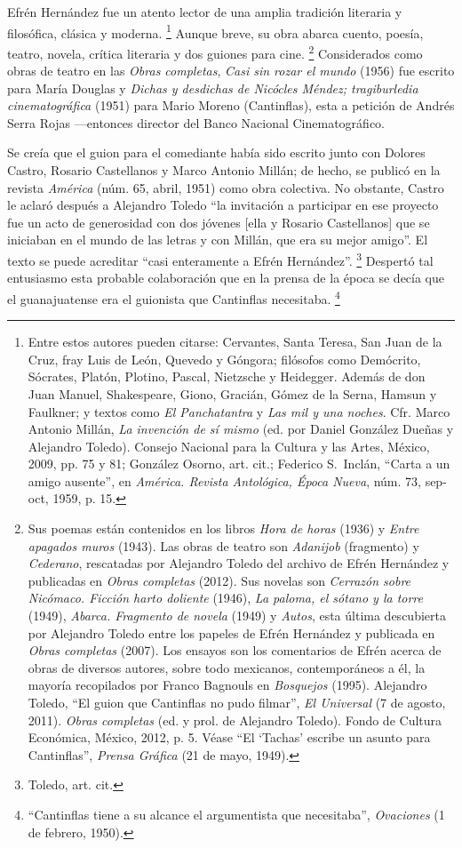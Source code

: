 \documentclass[14pt,twoside,final]{extbook} %
\let\oldfootnote\footnote
\renewcommand\footnote[1]{%
\oldfootnote{\hspace{1mm}#1}}
\begin{document}
Efrén Hernández fue un atento lector de una amplia tradición literaria y filosófica, clásica y moderna.\footnote{Entre estos autores pueden citarse: Cervantes, Santa Teresa, San Juan de la Cruz, fray Luis de León, Quevedo y Góngora; filósofos como Demócrito, Sócrates, Platón, Plotino, Pascal, Nietzsche y Heidegger. Además de don Juan Manuel, Shakespeare, Giono, Gracián, Gómez de la Serna, Hamsun y Faulkner; y textos como \emph{El Panchatantra} y \emph{Las mil y una noches}. Cfr. Marco Antonio Millán, \emph{La invención de sí mismo} (ed. por Daniel González Dueñas y Alejandro Toledo). Consejo Nacional para la Cultura y las Artes, México, 2009, pp. 75 y 81; González Osorno, art. cit.; Federico S.~Inclán, ``Carta a un amigo ausente'', en \emph{América. Revista Antológica, Época Nueva}, núm. 73, sep-oct, 1959, p. 15.} Aunque breve, su obra abarca cuento, poesía, teatro, novela, crítica literaria y dos guiones para cine.\footnote{Sus poemas están contenidos en los libros \emph{Hora de horas} (1936) y \emph{Entre apagados muros} (1943). Las obras de teatro son \emph{Adanijob} (fragmento) y \emph{Cederano}, rescatadas por Alejandro Toledo del archivo de Efrén Hernández y publicadas en \emph{Obras completas} (2012). Sus novelas son \emph{Cerrazón sobre Nicómaco. Ficción harto doliente} (1946), \emph{La paloma, el sótano y la torre} (1949), \emph{Abarca. Fragmento de novela} (1949) y \emph{Autos}, esta última descubierta por Alejandro Toledo entre los papeles de Efrén Hernández y publicada en \emph{Obras completas} (2007). Los ensayos son los comentarios de Efrén acerca de obras de diversos autores, sobre todo mexicanos, contemporáneos a él, la mayoría recopilados por Franco Bagnouls en \emph{Bosquejos} (1995). Alejandro Toledo, ``El guion que Cantinflas no pudo filmar'', \emph{El Universal} (7 de agosto, 2011). \emph{Obras completas} (ed. y prol. de Alejandro Toledo). Fondo de Cultura Económica, México, 2012, p. 5. Véase ``El `Tachas' escribe un asunto para Cantinflas'', \emph{Prensa Gráfica} (21 de mayo, 1949).} Considerados como obras de teatro en las \emph{Obras completas}, \emph{Casi sin rozar el mundo} (1956) fue escrito para María Douglas y \emph{Dichas y desdichas de Nicócles Méndez; tragiburledia cinematográfica} (1951) para Mario Moreno (Cantinflas), esta a petición de Andrés Serra Rojas ---entonces director del Banco Nacional Cinematográfico.

Se creía que el guion para el comediante había sido escrito junto con Dolores Castro, Rosario Castellanos y Marco Antonio Millán; de hecho, se publicó en la revista \emph{América} (núm. 65, abril, 1951) como obra colectiva. No obstante, Castro le aclaró después a Alejandro Toledo ``la invitación a participar en ese proyecto fue un acto de generosidad con dos jóvenes [ella y Rosario Castellanos] que se iniciaban en el mundo de las letras y con Millán, que era su mejor amigo''. El texto se puede acreditar ``casi enteramente a Efrén Hernández''.\footnote{Toledo, art. cit.} Despertó tal entusiasmo esta probable colaboración que en la prensa de la época se decía que el guanajuatense era el guionista que Cantinflas necesitaba.\footnote{``Cantinflas tiene a su alcance el argumentista que necesitaba'', \emph{Ovaciones} (1 de febrero, 1950).}
\end{document}
